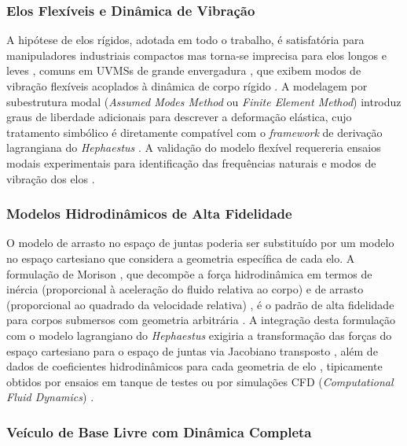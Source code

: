 \subsubsection*{Elos Flexíveis e Dinâmica de Vibração}

A hipótese de elos rígidos, adotada em todo o trabalho, é satisfatória para manipuladores industriais compactos mas torna-se imprecisa para elos longos e leves , comuns em UVMSs de grande envergadura , que exibem modos de vibração flexíveis acoplados à dinâmica de corpo rígido \cite{siciliano2009robotics, spong2020robot}. A modelagem por subestrutura modal (\textit{Assumed Modes Method} ou \textit{Finite Element Method}) introduz graus de liberdade adicionais para descrever a deformação elástica, cujo tratamento simbólico é diretamente compatível com o \textit{framework} de derivação lagrangiana do \textit{Hephaestus} \cite{craig1989introduction}. A validação do modelo flexível requereria ensaios modais experimentais para identificação das frequências naturais e modos de vibração dos elos \cite{golub2013matrix}.

\subsubsection*{Modelos Hidrodinâmicos de Alta Fidelidade}

O modelo de arrasto no espaço de juntas poderia ser substituído por um modelo no espaço cartesiano que considera a geometria específica de cada elo. A formulação de Morison \cite{newman1977marine} , que decompõe a força hidrodinâmica em termos de inércia (proporcional à aceleração do fluido relativa ao corpo) e de arrasto (proporcional ao quadrado da velocidade relativa) , é o padrão de alta fidelidade para corpos submersos com geometria arbitrária \cite{fossen2011handbook}. A integração desta formulação com o modelo lagrangiano do \textit{Hephaestus} exigiria a transformação das forças do espaço cartesiano para o espaço de juntas via Jacobiano transposto \cite{siciliano2009robotics}, além de dados de coeficientes hidrodinâmicos para cada geometria de elo , tipicamente obtidos por ensaios em tanque de testes ou por simulações CFD (\textit{Computational Fluid Dynamics}) \cite{antonelli2014modelling, aldhaheri2022underwater}.

\subsubsection*{Veículo de Base Livre com Dinâmica Completa}

